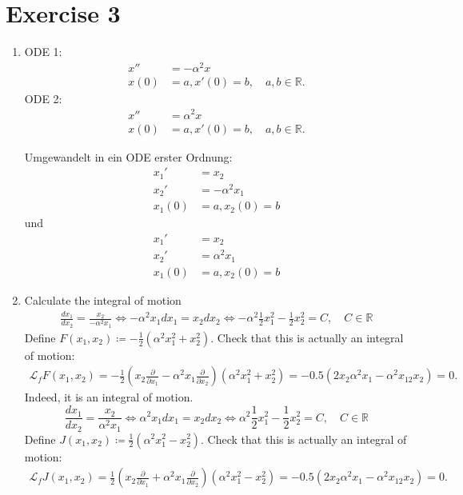 \documentclass{article}
\theoremstyle{named}
\begin{document}
\section*{Exercise 3}
\begin{enumerate}[label=(\roman*)]
	\item ODE 1:
	\begin{align*}
		x'' &= -\alpha^2x \\
		x(0) &= a, x'(0) = b, \quad a,b \in \mathbb R.
	\end{align*}
	ODE 2:
	\begin{align*}
		x'' &= \alpha^2x \\
		x(0) &= a, x'(0) = b, \quad a,b \in \mathbb R.
	\end{align*}
	
	Umgewandelt in ein ODE erster Ordnung:
	\begin{align*}
		x_1' &= x_2 \\
		x_2' &= -\alpha^2x_1 \\
		x_1(0) &=a, x_2(0) = b
	\end{align*}
	und
	\begin{align*}
		x_1' &= x_2 \\
		x_2' &= \alpha^2x_1 \\
		x_1(0) &=a, x_2(0) = b
	\end{align*}
	
	\item Calculate the integral of motion
	\begin{align*}
		\frac{dx_1}{dx_2} = \frac{x_2}{-\alpha^2x_1} \iff -\alpha^2x_1dx_1 = x_2dx_2 \iff -\alpha^2\frac{1}{2}x_1^2 - \frac{1}{2}x_2^2 = C, \quad C \in \mathbb R
	\end{align*} 
	Define $F(x_1,x_2) \coloneqq -\frac{1}{2}(\alpha^2x_1^2+x_2^2)$. Check that this is actually an integral of motion:
	\begin{align*}
		\mathcal L_fF(x_1,x_2) = -\frac{1}{2}(x_2 \frac{\partial}{\partial x_1} - \alpha^2x_1 \frac{\partial}{\partial x_2})(\alpha^2x_1^2+x_2^2) = -0.5(2x_2\alpha^2x_1 - \alpha^2x_12x_2) = 0.
	\end{align*}
	Indeed, it is an integral of motion.
	\[
		\frac{dx_1}{dx_2} = \frac{x_2}{\alpha^2x_1} \iff \alpha^2x_1dx_1 = x_2dx_2 \iff \alpha^2\frac{1}{2}x_1^2 - \frac{1}{2}x_2^2 = C, \quad C \in \mathbb R
	\]
	Define $J(x_1,x_2) \coloneqq \frac{1}{2}(\alpha^2x_1^2-x_2^2)$. Check that this is actually an integral of motion:
	\begin{align*}
	\mathcal L_fJ(x_1,x_2) = \frac{1}{2}(x_2 \frac{\partial}{\partial x_1} + \alpha^2x_1 \frac{\partial}{\partial x_2})(\alpha^2x_1^2-x_2^2) = -0.5(2x_2\alpha^2x_1 - \alpha^2x_12x_2) = 0.
	\end{align*}
	

\end{enumerate}
\end{document}
